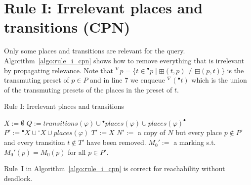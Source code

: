\section*{Rule I: Irrelevant places and transitions (CPN)}\label{sec:rule_i_cpn}
Only some places and transitions are relevant for the query.
Algorithm~\ref{algo:rule_i_cpn} shows how to remove everything that is irrelevant by propagating relevance.
Note that ${}^\nabla p=\{t\in {}^\bullet p\mid\boxplus(t,p)\neq\boxminus(p,t)\}$ is the transmuting preset of $p\in P$ and
in line 7 we enqueue ${}^\nabla({}^\bullet t)$ which is the union of the transmuting presets of the places in the preset of $t$.

\begin{algorithm}
    \vspace{0.2cm}
    \caption{Rule I: Irrelevant places and transitions}
    \label{algo:rule_i_cpn}
    \DontPrintSemicolon
    \LinesNumbered
    \vspace{1mm}
    $X:=\emptyset$
    $Q:=transitions(\varphi)\cup{}^\bullet places(\varphi)\cup places(\varphi)^\bullet$
    $P':={}^\bullet X\cup {}^\circ X\cup places(\varphi)$\;
    $T':=X$\;
    $N':=$ a copy of $N$ but every place $p\notin P'$ and every transition $t\notin T'$ have been removed.\;
    $M_0':=$ a marking s.t.\ $M_0'(p)=M_0(p)$ for all $p\in P'$.\;
    \vspace{0.2cm}
\end{algorithm}

\begin{theorem}
    Rule~I in Algorithm~\ref{algo:rule_i_cpn} is correct for reachability without deadlock.
\end{theorem}
